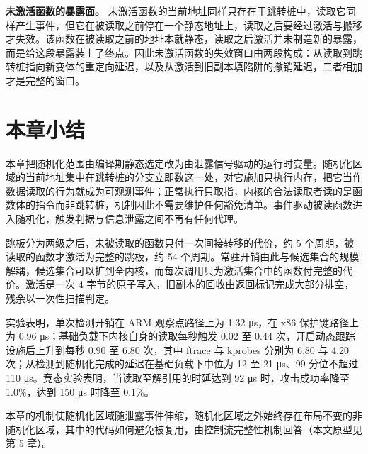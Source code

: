 \textbf{未激活函数的暴露面。} 未激活函数的当前地址同样只存在于跳转桩中，读取它同样产生事件，但它在被读取之前停在一个静态地址上，读取之后要经过激活与搬移才失效。该函数在被读取之前的地址本就静态，读取之后激活并未制造新的暴露，而是给这段暴露装上了终点。因此未激活函数的失效窗口由两段构成：从读取到跳转桩指向新变体的重定向延迟，以及从激活到旧副本填陷阱的撤销延迟，二者相加才是完整的窗口。

\section{本章小结}

本章把随机化范围由编译期静态选定改为由泄露信号驱动的运行时变量。随机化区域的当前地址集中在跳转桩的分支立即数这一处，对它施加只执行内存，把它当作数据读取的行为就成为可观测事件；正常执行只取指，内核的合法读取者读的是函数体的指令而非跳转桩，机制因此不需要维护任何豁免清单。事件驱动被读函数进入随机化，触发判据与信息泄露之间不再有任何代理。

跳板分为两级之后，未被读取的函数只付一次间接转移的代价，约 5 个周期，被读取的函数才激活为完整的跳板，约 54 个周期。常驻开销由此与候选集合的规模解耦，候选集合可以扩到全内核，而每次调用只为激活集合中的函数付完整的代价。激活是一次 4 字节的原子写入，旧副本的回收由返回标记完成大部分排空，残余以一次性扫描判定。

实验表明，单次检测开销在 ARM 观察点路径上为 1.32 μs，在 x86 保护键路径上为 0.96 μs；基础负载下内核自身的读取每秒触发 0.02 至 0.44 次，开启动态跟踪设施后上升到每秒 0.90 至 6.80 次，其中 ftrace 与 kprobes 分别为 6.80 与 4.20 次；从检测到随机化完成的延迟在基础负载下中位为 12 至 21 μs、99 分位不超过 110 μs。竞态实验表明，当读取至解引用的时延达到 92 μs 时，攻击成功率降至 1.0\%，达到 150 μs 时降至 0.1\%。

本章的机制使随机化区域随泄露事件伸缩，随机化区域之外始终存在布局不变的非随机化区域，其中的代码如何避免被复用，由控制流完整性机制回答（本文原型见第 5 章）。

